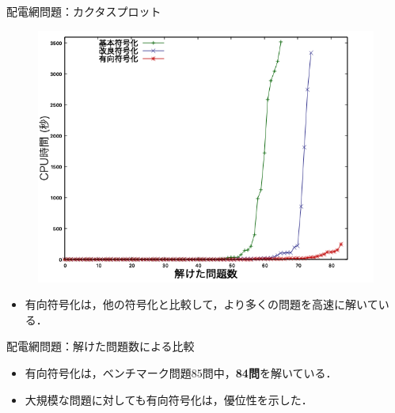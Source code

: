 \documentclass[dvipdfmx,11pt]{beamer}
\begin{document}
\begin{frame}{配電網問題：カクタスプロット}
 \begin{figure}[h]
  \centering
  \includegraphics[scale=0.4]{fig/cactus.png}
 \end{figure}

\begin{itemize}
 \item 有向符号化は，他の符号化と比較して，より多くの問題を高速に解いている．
\end{itemize}\vfill
\end{frame}
\begin{frame}{配電網問題：解けた問題数による比較}
 
\begin{table}[t]
 \centering
 
\end{table}\vfill

\begin{itemize}
 \item 有向符号化は，ベンチマーク問題85問中，\textbf{84問}を解いている．
 \item 大規模な問題に対しても有向符号化は，優位性を示した．
\end{itemize}\vfill
\end{frame}
\end{document}

